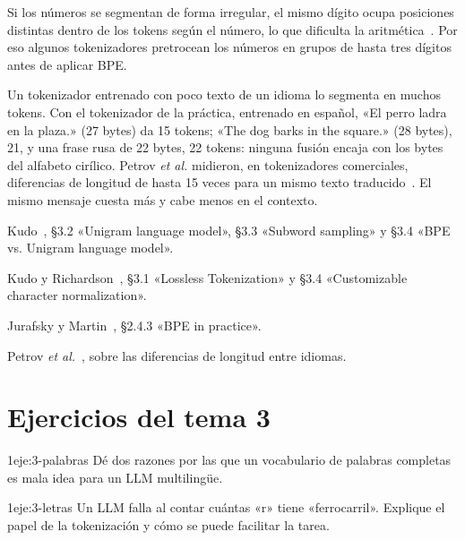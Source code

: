 \begin{observacion}[Números]
Si los números se segmentan de forma irregular, el mismo dígito ocupa posiciones distintas dentro de los tokens según el número, lo que dificulta la aritmética~\cite[ejercicio~2.2]{jm3}. Por eso algunos tokenizadores pretrocean los números en grupos de hasta tres dígitos antes de aplicar BPE.
\end{observacion}

\begin{observacion}[Idiomas]
Un tokenizador entrenado con poco texto de un idioma lo segmenta en muchos tokens. Con el tokenizador de la práctica, entrenado en español, «El perro ladra en la plaza.» (27 bytes) da 15 tokens; «The dog barks in the square.» (28 bytes), 21, y una frase rusa de 22 bytes, 22 tokens: ninguna fusión encaja con los bytes del alfabeto cirílico. Petrov \emph{et al.} midieron, en tokenizadores comerciales, diferencias de longitud de hasta 15 veces para un mismo texto traducido~\cite{petrov}. El mismo mensaje cuesta más y cabe menos en el contexto.
\end{observacion}

\begin{lecturas}
\item Kudo~\cite{kudo}, §3.2 «Unigram language model», §3.3 «Subword sampling» y §3.4 «BPE vs. Unigram language model».
\item Kudo y Richardson~\cite{sentencepiece}, §3.1 «Lossless Tokenization» y §3.4 «Customizable character normalization».
\item Jurafsky y Martin~\cite{jm3}, §2.4.3 «BPE in practice».
\item Petrov \emph{et al.}~\cite{petrov}, sobre las diferencias de longitud entre idiomas.
\end{lecturas}

\section*{Ejercicios del tema 3}

\begin{ejercicio}{1}{eje:3-palabras}
Dé dos razones por las que un vocabulario de palabras completas es mala idea para un LLM multilingüe.
\end{ejercicio}

\begin{ejercicio}{1}{eje:3-letras}
Un LLM falla al contar cuántas «r» tiene «ferrocarril». Explique el papel de la tokenización y cómo se puede facilitar la tarea.
\end{ejercicio}

